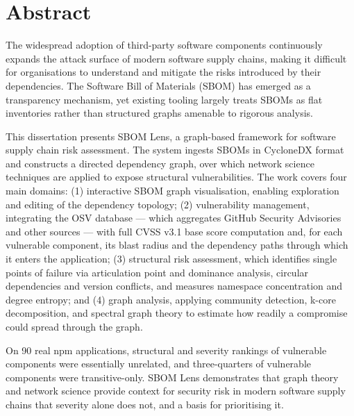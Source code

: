 \MediaOptionLogicBlank

\chapter*{Abstract}

The widespread adoption of third-party software components continuously expands the attack surface of modern software supply chains, making it difficult for organisations to understand and mitigate the risks introduced by their dependencies. The Software Bill of Materials (SBOM) has emerged as a transparency mechanism, yet existing tooling largely treats SBOMs as flat inventories rather than structured graphs amenable to rigorous analysis.

This dissertation presents SBOM Lens, a graph-based framework for software supply chain risk assessment. The system ingests SBOMs in CycloneDX format and constructs a directed dependency graph, over which network science techniques are applied to expose structural vulnerabilities. The work covers four main domains: (1) interactive SBOM graph visualisation, enabling exploration and editing of the dependency topology; (2) vulnerability management, integrating the OSV database --- which aggregates GitHub Security Advisories and other sources --- with full CVSS v3.1 base score computation and, for each vulnerable component, its blast radius and the dependency paths through which it enters the application; (3) structural risk assessment, which identifies single points of failure via articulation point and dominance analysis, circular dependencies and version conflicts, and measures namespace concentration and degree entropy; and (4) graph analysis, applying community detection, k-core decomposition, and spectral graph theory to estimate how readily a compromise could spread through the graph.

On 90 real npm applications, structural and severity rankings of vulnerable components were essentially unrelated, and three-quarters of vulnerable components were transitive-only. SBOM Lens demonstrates that graph theory and network science provide context for security risk in modern software supply chains that severity alone does not, and a basis for prioritising it.


\MediaOptionLogicBlank